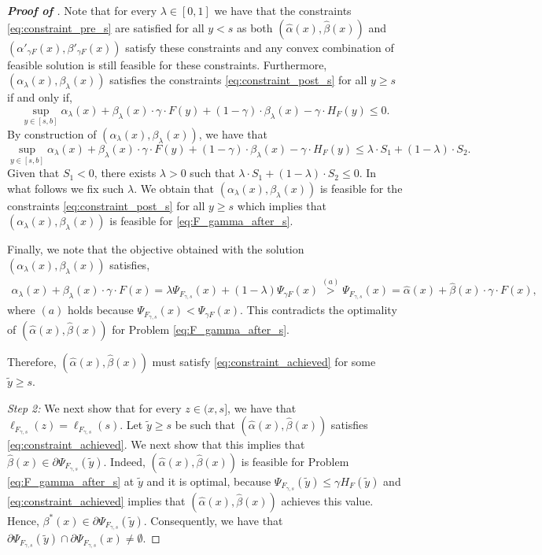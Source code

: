 \begin{proof}[\textbf{Proof of }]
Note that for every $\lambda \in [0,1]$ we have that the constraints \eqref{eq:constraint_pre_s} are satisfied for all $y < s$ as both $(\hat{\alpha}(x),\hat{\beta}(x))$ and $(\alpha'_{\gamma F}(x),\beta'_{\gamma F}(x))$ satisfy these constraints and any convex combination of feasible solution is still feasible for these constraints.
Furthermore, $(\alpha_\lambda(x),\beta_\lambda(x))$ satisfies the constraints \eqref{eq:constraint_post_s} for all $y \geq s$ if and only if,
\begin{equation*}
    \sup_{y \in [s,b]} \alpha_\lambda(x) + \beta_\lambda(x) \cdot \gamma \cdot F(y) + (1-\gamma) \cdot  \beta_\lambda(x) - \gamma \cdot H_{F}(y) \leq 0.
\end{equation*}
By construction of $(\alpha_\lambda(x),\beta_\lambda(x))$, we have that
\begin{equation*}
    \sup_{y \in [s,b]} \alpha_\lambda(x) + \beta_\lambda(x) \cdot \gamma \cdot F(y) + (1-\gamma) \cdot  \beta_\lambda(x) - \gamma \cdot H_{F}(y) \leq \lambda \cdot S_1 + (1-\lambda) \cdot S_2.
\end{equation*}
Given that $S_1 < 0$, there exists $\lambda > 0$ such that $\lambda \cdot S_1 + (1-\lambda) \cdot S_2 \leq 0.$ In what follows we fix such $\lambda$. We obtain that $(\alpha_\lambda(x),\beta_\lambda(x))$ is feasible for the constraints \eqref{eq:constraint_post_s} for all $y \geq s$ which implies that $(\alpha_\lambda(x),\beta_\lambda(x))$ is feasible for \eqref{eq:F_gamma_after_s}. 

Finally, we note that the objective obtained with the solution $(\alpha_\lambda(x),\beta_\lambda(x))$ satisfies,
\begin{align*}
    \alpha_\lambda(x) + \beta_\lambda(x) \cdot \gamma \cdot F(x) 
    = \lambda \Psi_{F_{\gamma,s}}(x) + (1-\lambda) \Psi_{\gamma F}(x)
    \stackrel{(a)}{>} \Psi_{F_{\gamma,s}}(x) = \hat{\alpha}(x) + \hat{\beta}(x) \cdot \gamma \cdot F(x),
\end{align*}
where $(a)$ holds because $\Psi_{F_{\gamma,s}}(x) < \Psi_{\gamma F}(x)$. This contradicts the optimality of $(\hat{\alpha}(x),\hat{\beta}(x))$ for Problem \eqref{eq:F_gamma_after_s}. 

Therefore, $(\hat{\alpha}(x),\hat{\beta}(x))$ must satisfy \eqref{eq:constraint_achieved} for some $\tilde{y} \geq s$. 

\textit{Step 2:} We next show that for every $z \in (x,s]$, we have that  $\ell_{F_{\gamma,s}}(z) = \ell_{F_{\gamma,s}}(s)$. 
Let $\tilde{y} \geq s$ be such that $(\hat{\alpha}(x),\hat{\beta}(x))$ satisfies \eqref{eq:constraint_achieved}. We next show that this implies that $\hat{\beta} (x) \in \partial \Psi_{F_{\gamma,s}}(\tilde{y})$. 
Indeed, $(\hat{\alpha}(x),\hat{\beta}(x))$ is feasible for Problem \eqref{eq:F_gamma_after_s} at $\tilde{y}$ and it is optimal, because $\Psi_{F_{\gamma,s}}(\tilde{y}) \leq \gamma H_{F}(\tilde{y})$ and \eqref{eq:constraint_achieved} implies that $(\hat{\alpha}(x),\hat{\beta}(x))$ achieves this value. Hence, $\beta^*(x) \in \partial \Psi_{F_{\gamma,s}}(\tilde{y})$. Consequently, we have that $\partial \Psi_{F_{\gamma,s}}(\tilde{y}) \cap \partial \Psi_{F_{\gamma,s}}(x) \neq \emptyset$.


\end{proof}

